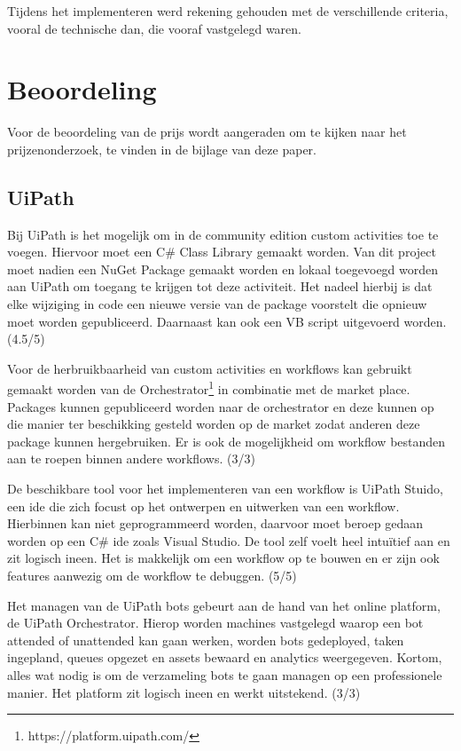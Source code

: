 Tijdens het implementeren werd rekening gehouden met de verschillende criteria, vooral de technische dan, die vooraf vastgelegd waren.

\section{Beoordeling}
Voor de beoordeling van de prijs wordt aangeraden om te kijken naar het prijzenonderzoek, te vinden in de bijlage van deze paper.

\subsection{UiPath}
Bij UiPath is het mogelijk om in de community edition custom activities toe te voegen. Hiervoor moet een C\# Class Library gemaakt worden. Van dit project moet nadien een NuGet Package gemaakt worden en lokaal toegevoegd worden aan UiPath om toegang te krijgen tot deze \gls{activiteit}. Het nadeel hierbij is dat elke wijziging in code een nieuwe versie van de package voorstelt die opnieuw moet worden gepubliceerd. Daarnaast kan ook een VB script uitgevoerd worden. (4.5/5)

Voor de herbruikbaarheid van custom activities en \gls{workflow}s kan gebruikt gemaakt worden van de Orchestrator\footnote{https://platform.uipath.com/} in combinatie met de market place. Packages kunnen gepubliceerd worden naar de orchestrator en deze kunnen op die manier ter beschikking gesteld worden op de market zodat anderen deze package kunnen hergebruiken. Er is ook de mogelijkheid om \gls{workflow} bestanden aan te roepen binnen andere \gls{workflow}s. (3/3) 

De beschikbare tool voor het implementeren van een \gls{workflow} is UiPath Stuido, een \acrfull{ide} die zich focust op het ontwerpen en uitwerken van een \gls{workflow}. Hierbinnen kan niet geprogrammeerd worden, daarvoor moet beroep gedaan worden op een C\# \acrshort{ide} zoals Visual Studio. De tool zelf voelt heel intuïtief aan en zit logisch ineen. Het is makkelijk om een \gls{workflow} op te bouwen en er zijn ook features aanwezig om de \gls{workflow} te debuggen. (5/5)

Het managen van de UiPath bots gebeurt aan de hand van het online platform, de UiPath Orchestrator. Hierop worden machines vastgelegd waarop een bot attended of unattended kan gaan werken, worden bots gedeployed, taken ingepland, queues opgezet en assets bewaard en analytics weergegeven. Kortom, alles wat nodig is om de verzameling bots te gaan managen op een professionele manier. Het platform zit logisch ineen en werkt uitstekend. (3/3)

